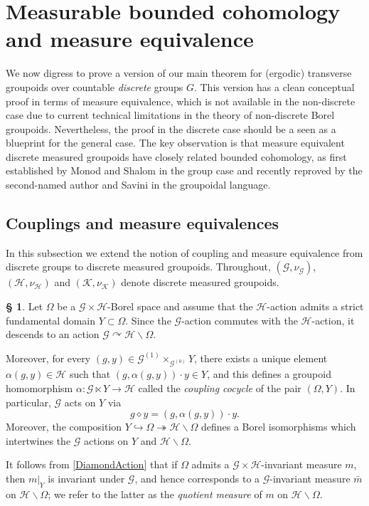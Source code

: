 \documentclass[11pt, oneside]{amsart}
\theoremstyle{definition}
\newtheorem{no}[lemma]{\S}
\theoremstyle{remark}
\theoremstyle{TheoremNum}
\newcommand{\cG}{\mathcal{G}}
\newcommand{\cH}{\mathcal{H}}
\newcommand{\cK}{\mathcal{K}}
\begin{document}
\section{Measurable bounded cohomology and measure equivalence}\label{sec:BCandME}

We now digress to prove a version of our main theorem for (ergodic) transverse groupoids over countable \emph{discrete} groups $G$. This version has a clean conceptual proof in terms of measure equivalence, which is not available in the non-discrete case due to current technical limitations in the theory of non-discrete Borel groupoids. Nevertheless, the proof in the discrete case should be a seen as a blueprint for the general case. The key observation is that measure equivalent discrete measured groupoids have closely related bounded cohomology, as first established by Monod and Shalom \cite{MonShal} in the group case and recently reproved by the second-named author and Savini \cite{sarti:savini:23} in the groupoidal language.

\subsection{Couplings and measure equivalences}\label{sec:4.1}

In this subsection we extend the notion of coupling and measure equivalence from discrete groups to discrete measured groupoids. Throughout, $(\cG, \nu_{\cG})$, $(\cH, \nu_{\cH})$ and $(\cK, \nu_{\cK})$ denote discrete measured groupoids.
\begin{no}\label{QuotientMeasure} Let $\Omega$ be a $\cG \times \cH$-Borel space and assume that the $\cH$-action admits a strict fundamental domain $Y \subset \Omega$. Since the $\cG$-action commutes with the $\cH$-action, it descends to an action $\cG \curvearrowright \cH \backslash \Omega$.

Moreover, for every $(g,y)\in\mathcal{G}^{(1)}\times_{\mathcal{G}^{(0)}} Y$, there exists a unique element $\alpha(g,y) \in \mathcal{H}$ such that $(g,\alpha(g,y)) \cdot y\in Y$, and this defines a groupoid homomorphism $\alpha: \mathcal{G}\ltimes Y \to \mathcal{H}$ called the \emph{coupling cocycle} of the pair $(\Omega, Y)$. In particular, $\cG$ acts on $Y$ via \begin{equation}\label{DiamondAction}g \diamond  y= (g, \alpha(g,y)) \cdot y.\end{equation} Moreover, the composition $Y \hookrightarrow \Omega \twoheadrightarrow \cH \backslash \Omega$ defines a Borel isomorphisms which intertwines the $\cG$ actions on $Y$ and $\cH \backslash \Omega$. 

It follows from \eqref{DiamondAction} that if $\Omega$ admits a $\cG \times \cH$-invariant measure $m$, then $m|_Y$ is invariant under $\cG$, and hence corresponds to a $\cG$-invariant measure $\bar m$ on $\cH \backslash \Omega$; we refer to the latter as the \emph{quotient measure} of $m$ on $\cH \backslash \Omega$.
\end{no}
\end{document}
